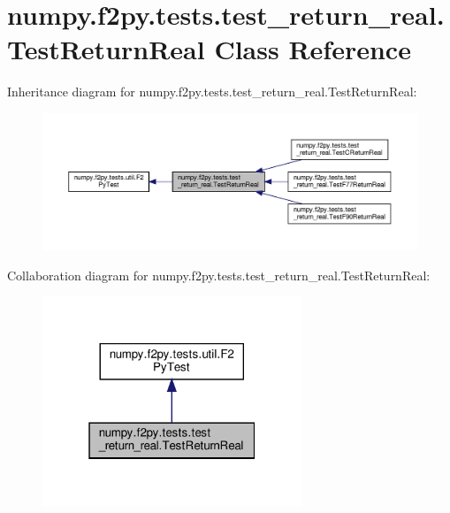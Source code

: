 \hypertarget{classnumpy_1_1f2py_1_1tests_1_1test__return__real_1_1TestReturnReal}{}\section{numpy.\+f2py.\+tests.\+test\+\_\+return\+\_\+real.\+Test\+Return\+Real Class Reference}
\label{classnumpy_1_1f2py_1_1tests_1_1test__return__real_1_1TestReturnReal}


Inheritance diagram for numpy.\+f2py.\+tests.\+test\+\_\+return\+\_\+real.\+Test\+Return\+Real\+:
\nopagebreak
\begin{figure}[H]
\begin{center}
\leavevmode
\includegraphics[width=350pt]{classnumpy_1_1f2py_1_1tests_1_1test__return__real_1_1TestReturnReal__inherit__graph}
\end{center}
\end{figure}


Collaboration diagram for numpy.\+f2py.\+tests.\+test\+\_\+return\+\_\+real.\+Test\+Return\+Real\+:
\nopagebreak
\begin{figure}[H]
\begin{center}
\leavevmode
\includegraphics[width=220pt]{classnumpy_1_1f2py_1_1tests_1_1test__return__real_1_1TestReturnReal__coll__graph}
\end{center}
\end{figure}
